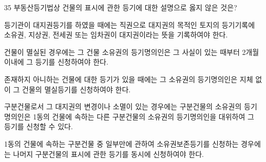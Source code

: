 \begin{question}{35}
부동산등기법상 건물의 표시에 관한 등기에 대한 설명으로 옳지 않은 것은?
\begin{choices}
  \item 등기관이 대지권등기를 하였을 때에는 직권으로 대지권의 목적인 토지의 등기기록에 소유권, 지상권, 전세권 또는 임차권이 대지권이라는 뜻을 기록하여야 한다.
  \item 건물이 멸실된 경우에는 그 건물 소유권의 등기명의인은 그 사실이 있는 때부터 2개월 이내에 그 등기를 신청하여야 한다.
  \item 존재하지 아니하는 건물에 대한 등기가 있을 때에는 그 소유권의 등기명의인은 지체 없이 그 건물의 멸실등기를 신청하여야 한다.
  \item 구분건물로서 그 대지권의 변경이나 소멸이 있는 경우에는 구분건물의 소유권의 등기명의인은 1동의 건물에 속하는 다른 구분건물의 소유권의 등기명의인을 대위하여 그 등기를 신청할 수 있다.
  \item 1동의 건물에 속하는 구분건물 중 일부만에 관하여 소유권보존등기를 신청하는 경우에는 나머지 구분건물의 표시에 관한 등기를 동시에 신청하여야 한다.
\end{choices}
\end{question}
